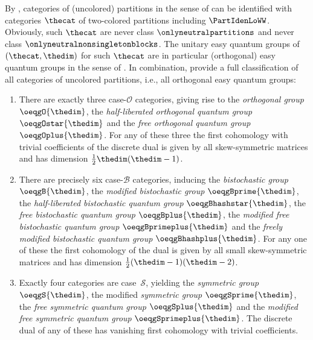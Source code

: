\documentclass[pdftex]{sigma}
\numberwithin{equation}{section}
\begin{document}
    \begin{Remark}
      By \cite[Proposition~1.4]{TarragoWeber2018}, categories of (uncolored) partitions in the sense of \cite[Definition~2.2]{BanicaSpeicher2009} can be identified with categories $\thecat$ of two-colored partitions including $\PartIdenLoWW$. Obviously, such $\thecat$ are never class $\onlyneutralpartitions$ and never class $\onlyneutralnonsingletonblocks$.  The unitary easy quantum groups of $(\thecat,\thedim)$ for such $\thecat$ are in particular (orthogonal) easy quantum groups in the sense of \cite{BanicaSpeicher2009}. In combination,  \cite{BanicaCurranSpeicher2010,BanicaSpeicher2009, RaumWeber2014, RaumWeber2016a, RaumWeber2016b, Weber2013} provide a full classification of all categories of uncolored partitions, i.e., all orthogonal easy quantum groups:
      \begin{enumerate}
      \item
        There are exactly three case-$\mathcal{O}$ categories, giving rise to the \emph{orthogonal group} $\oeqgO{\thedim}$, the \emph{half-liberated orthogonal quantum group} $\oeqgOstar{\thedim}$ and the \emph{free orthogonal quantum group} $\oeqgOplus{\thedim}$. For any of these three the first cohomology with trivial coefficients of the discrete dual is given by all skew-symmetric matrices and has dimension $\frac{1}{2}\thedim(\thedim-1)$.
        \item There are precisely six case-$\mathcal{B}$ categories, inducing the \emph{bistochastic group} $\oeqgB{\thedim}$,   the \emph{modified bistochastic group} $\oeqgBprime{\thedim}$, the \emph{half-liberated bistochastic quantum group} $\oeqgBhashstar{\thedim}$, the \emph{free bistochastic quantum group} $\oeqgBplus{\thedim}$, the \emph{modified free bistochastic quantum group} $\oeqgBprimeplus{\thedim}$ and the \emph{freely modified bistochastic quantum group} $\oeqgBhashplus{\thedim}$. For any one of these the first cohomology of the dual is given by all  small skew-symmetric matrices and has dimension $\frac{1}{2}(\thedim-1)(\thedim-2)$.
        \item Exactly four categories are case~$\mathcal{S}$, yielding the \emph{symmetric group} $\oeqgS{\thedim}$, the modified \emph{symmetric group} $\oeqgSprime{\thedim}$, the \emph{free symmetric quantum group}  $\oeqgSplus{\thedim}$ and the \emph{modified free symmetric quantum group} $\oeqgSprimeplus{\thedim}$. The discrete dual of  any of these has vanishing first cohomology with trivial coefficients.

\end{enumerate}
\end{Remark}
\end{document}

